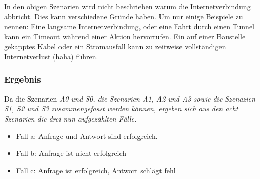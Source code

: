 In den obigen Szenarien wird nicht beschrieben warum die Internetverbindung abbricht. Dies kann verschiedene Gründe haben. Um nur einige Beispiele zu nennen: Eine langsame Internetverbindung, oder eine Fahrt durch einen Tunnel kann ein Timeout während einer Aktion hervorrufen. Ein auf einer Baustelle gekapptes Kabel oder ein Stromausfall kann zu zeitweise vollständigen Internetverlust (haha) führen.
%
%
\subsubsection*{Ergebnis}
Da die Szenarien \it{A0} und \it{S0}, die Szenarien \it{A1}, \it{A2} und \it{A3} sowie die Szenazien \it{S1}, \it{S2} und \it{S3} zusammengefasst werden können, ergeben sich aus den acht Szenarien die drei nun aufgezählten Fälle.
\begin{itemize}
  \item Fall a: Anfrage und Antwort sind erfolgreich.
  \item Fall b: Anfrage ist nicht erfolgreich
  \item Fall c: Anfrage ist erfolgreich, Antwort schlägt fehl
\end{itemize}